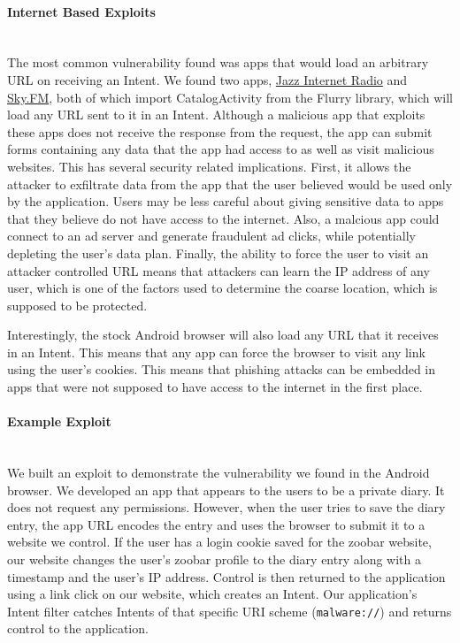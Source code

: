 \documentclass[12pt,a4paper]{article}
\begin{document}
\paragraph{Internet Based Exploits} ~\\
The most common vulnerability found was apps that would load an arbitrary URL on
receiving an Intent. We found two apps,
\href{https://play.google.com/store/apps/details?id=com.audioaddict.jr\&feature=search\_result#?t=W251bGwsMSwxLDEsImNvbS5hdWRpb2FkZGljdC5qciJd}{Jazz
Internet Radio} and
\href{https://play.google.com/store/apps/details?id=com.audioaddict.sky\&feature=search\_result#?t=W251bGwsMSwxLDEsImNvbS5hdWRpb2FkZGljdC5za3kiXQ..}{Sky.FM},
both of which import CatalogActivity from the Flurry library, which will load
any URL sent to it in an Intent. Although a malicious app that exploits these
apps does not receive the response from the request, the app can submit forms
containing any data that the app had access to as well as visit malicious
websites. This has several security related implications. First, it allows the
attacker to exfiltrate data from the app that the user believed would be used
only by the application. Users may be less careful about giving sensitive data
to apps that they believe do not have access to the internet.  Also, a malcious
app could connect to an ad server and generate fraudulent ad clicks, while
potentially depleting the user's data plan.  Finally, the ability to force the
user to visit an attacker controlled URL means that attackers can learn the IP
address of any user, which is one of the factors used to determine the coarse
location, which is supposed to be protected.

Interestingly, the stock Android browser will also load any URL that it receives
in an Intent. This means that any app can force the browser to visit any link
using the user's cookies. This means that phishing attacks can be embedded in
apps that were not supposed to have access to the internet in the first place.

\paragraph{Example Exploit} ~\\
We built an exploit to demonstrate the vulnerability we found in the Android
browser. We developed an app that appears to the users to be a private diary. It
does not request any permissions. However, when the user tries to save the diary
entry, the app URL encodes the entry and uses the browser to submit it to a
website we control. If the user has a login cookie saved for the zoobar website,
our website changes the user's zoobar profile to the diary entry along with a
timestamp and the user's IP address. Control is then returned to the application
using a link click on our website, which creates an Intent. Our application's
Intent filter catches Intents of that specific URI scheme (\texttt{malware://})
and returns control to the application.
\end{document}
